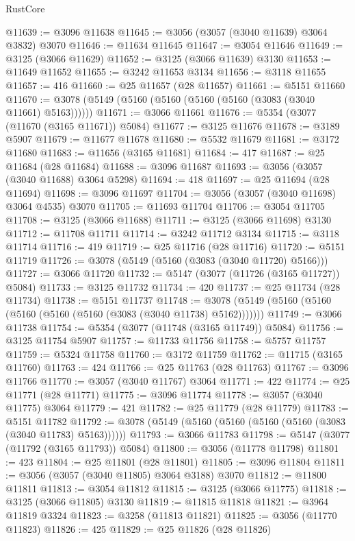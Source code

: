 \begin{lexlean}{RustCore}
\begin{coremodule}
@11639 := @3096 @11638
@11645 := @3056 (@3057 (@3040 @11639) @3064 @3832) @3070
@11646 := @11634 @11645
@11647 := @3054 @11646
@11649 := @3125 (@3066 @11629)
@11652 := @3125 (@3066 @11639) @3130
@11653 := @11649 @11652
@11655 := @3242 @11653 @3134
@11656 := @3118 @11655
@11657 := 416
@11660 := @25 @11657 (@28 @11657)
@11661 := @5151 @11660
@11670 := @3078 (@5149 (@5160 (@5160 (@5160 (@5160 (@3083 (@3040 @11661) @5163))))))
@11671 := @3066 @11661
@11676 := @5354 (@3077 (@11670 (@3165 @11671)) @5084)
@11677 := @3125 @11676
@11678 := @3189 @5907
@11679 := @11677 @11678
@11680 := @5532 @11679
@11681 := @3172 @11680
@11683 := @11656 (@3165 @11681)
@11684 := 417
@11687 := @25 @11684 (@28 @11684)
@11688 := @3096 @11687
@11693 := @3056 (@3057 (@3040 @11688) @3064 @5298)
@11694 := 418
@11697 := @25 @11694 (@28 @11694)
@11698 := @3096 @11697
@11704 := @3056 (@3057 (@3040 @11698) @3064 @4535) @3070
@11705 := @11693 @11704
@11706 := @3054 @11705
@11708 := @3125 (@3066 @11688)
@11711 := @3125 (@3066 @11698) @3130
@11712 := @11708 @11711
@11714 := @3242 @11712 @3134
@11715 := @3118 @11714
@11716 := 419
@11719 := @25 @11716 (@28 @11716)
@11720 := @5151 @11719
@11726 := @3078 (@5149 (@5160 (@3083 (@3040 @11720) @5166)))
@11727 := @3066 @11720
@11732 := @5147 (@3077 (@11726 (@3165 @11727)) @5084)
@11733 := @3125 @11732
@11734 := 420
@11737 := @25 @11734 (@28 @11734)
@11738 := @5151 @11737
@11748 := @3078 (@5149 (@5160 (@5160 (@5160 (@5160 (@5160 (@3083 (@3040 @11738) @5162)))))))
@11749 := @3066 @11738
@11754 := @5354 (@3077 (@11748 (@3165 @11749)) @5084)
@11756 := @3125 @11754 @5907
@11757 := @11733 @11756
@11758 := @5757 @11757
@11759 := @5324 @11758
@11760 := @3172 @11759
@11762 := @11715 (@3165 @11760)
@11763 := 424
@11766 := @25 @11763 (@28 @11763)
@11767 := @3096 @11766
@11770 := @3057 (@3040 @11767) @3064
@11771 := 422
@11774 := @25 @11771 (@28 @11771)
@11775 := @3096 @11774
@11778 := @3057 (@3040 @11775) @3064
@11779 := 421
@11782 := @25 @11779 (@28 @11779)
@11783 := @5151 @11782
@11792 := @3078 (@5149 (@5160 (@5160 (@5160 (@5160 (@3083 (@3040 @11783) @5163))))))
@11793 := @3066 @11783
@11798 := @5147 (@3077 (@11792 (@3165 @11793)) @5084)
@11800 := @3056 (@11778 @11798)
@11801 := 423
@11804 := @25 @11801 (@28 @11801)
@11805 := @3096 @11804
@11811 := @3056 (@3057 (@3040 @11805) @3064 @3188) @3070
@11812 := @11800 @11811
@11813 := @3054 @11812
@11815 := @3125 (@3066 @11775)
@11818 := @3125 (@3066 @11805) @3130
@11819 := @11815 @11818
@11821 := @3964 @11819 @3324
@11823 := @3258 (@11813 @11821)
@11825 := @3056 (@11770 @11823)
@11826 := 425
@11829 := @25 @11826 (@28 @11826)

\end{coremodule}
\end{lexlean}

